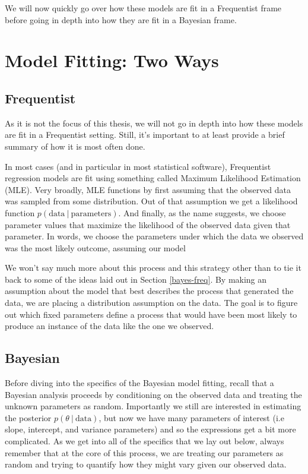 \documentclass[12pt,twoside]{reedthesis}
\begin{document}
We will now quickly go over how these models are fit in a Frequentist frame before going in depth into how they are fit in a Bayesian frame.

\hypertarget{twofits}{%
\section{Model Fitting: Two Ways}\label{twofits}}

\hypertarget{frequentist}{%
\subsection{Frequentist}\label{frequentist}}

As it is not the focus of this thesis, we will not go in depth into how these models are fit in a Frequentist setting. Still, it's important to at least provide a brief summary of how it is most often done.

In most cases (and in particular in most statistical software), Frequentist regression models are fit using something called Maximum Likelihood Estimation (MLE). Very broadly, MLE functions by first assuming that the observed data was sampled from some distribution. Out of that assumption we get a likelihood function \(p(\text{data} \ | \ \text{parameters})\). And finally, as the name suggests, we choose parameter values that maximize the likelihood of the observed data given that parameter. In words, we choose the parameters under which the data we observed was the most likely outcome, assuming our model

We won't say much more about this process and this strategy other than to tie it back to some of the ideas laid out in Section \ref{bayes-freq}. By making an assumption about the model that best describes the process that generated the data, we are placing a distribution assumption on the data. The goal is to figure out which fixed parameters define a process that would have been most likely to produce an instance of the data like the one we observed.

\hypertarget{bayesian}{%
\subsection{Bayesian}\label{bayesian}}

Before diving into the specifics of the Bayesian model fitting, recall that a Bayesian analysis proceeds by conditioning on the observed data and treating the unknown parameters as random. Importantly we still are interested in estimating the posterior \(p(\theta \ | \ \text{data})\), but now we have many parameters of interest (i.e slope, intercept, and variance parameters) and so the expressions get a bit more complicated. As we get into all of the specifics that we lay out below, always remember that at the core of this process, we are treating our parameters as random and trying to quantify how they might vary given our observed data.
\end{document}
